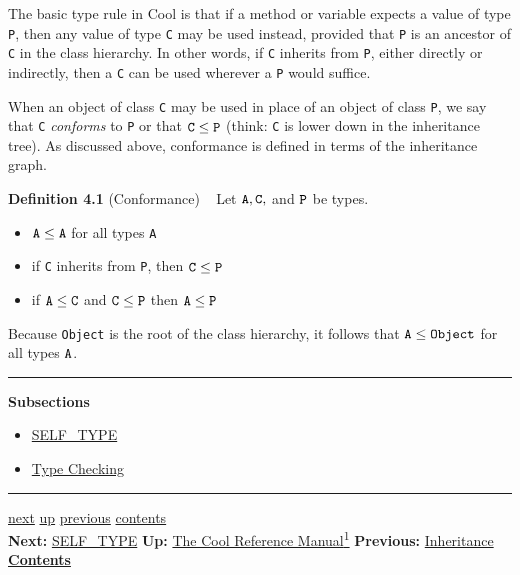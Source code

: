 \documentclass[]{article}
\begin{document}
The basic type rule in Cool is that if a method or variable expects a
value of type \texttt{P}, then any value of type \texttt{C} may be used
instead, provided that \texttt{P} is an ancestor of \texttt{C} in the
class hierarchy. In other words, if \texttt{C} inherits from \texttt{P},
either directly or indirectly, then a \texttt{C} can be used wherever a
\texttt{P} would suffice.

When an object of class \texttt{C} may be used in place of an object of
class \texttt{P}, we say that \texttt{C} \emph{conforms} to \texttt{P}
or that $\tt C \leq P$ (think: \texttt{C} is lower down in the
inheritance tree). As discussed above, conformance is defined in terms
of the inheritance graph.

\textbf{Definition 4.1} (Conformance) ~ Let $\tt A,C,$ and $\tt P$ be
types.

\begin{itemize}
\itemsep1pt\parskip0pt
\item
  $\tt A \leq A$ for all types \texttt{A}
\item
  if \texttt{C} inherits from \texttt{P}, then $\tt C \leq P$
\item
  if $\tt A \leq C$ and $\tt C \leq P$ then $\tt A \leq P$
\end{itemize}

Because \texttt{Object} is the root of the class hierarchy, it follows
that $\tt A \leq Object$ for all types $\tt A$.

\begin{center}\rule{3in}{0.4pt}\end{center}

\textbf{Subsections}

\begin{itemize}
\itemsep1pt\parskip0pt
\item
  \href{node8.html}{SELF\_TYPE}
\item
  \href{node9.html}{Type Checking}
\end{itemize}

\begin{center}\rule{3in}{0.4pt}\end{center}

\href{node8.html}{next} \href{cool-manual.html}{up}
\href{node6.html}{previous} \href{node1.html}{contents} \\
\textbf{Next:} \href{node8.html}{SELF\_TYPE} \textbf{Up:}
\href{cool-manual.html}{The Cool Reference Manual\textsuperscript{1}}
\textbf{Previous:} \href{node6.html}{Inheritance} ~
\textbf{\href{node1.html}{Contents}}
\end{document}
